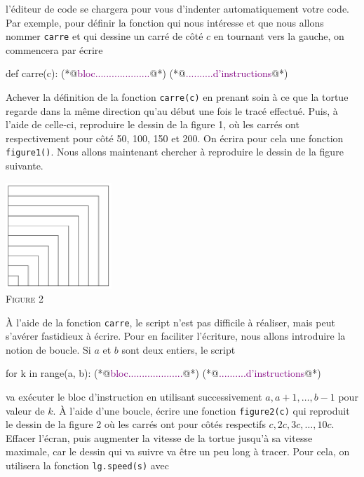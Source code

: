 \documentclass{magnolia}
\begin{document}
\begin{questions}
l'éditeur de code se chargera pour vous d'indenter automatiquement votre code. Par exemple, pour
définir la fonction qui nous intéresse et que nous allons nommer \verb!carre! et qui dessine un carré de côté
$c$ en tournant vers la gauche, on commencera par écrire
\begin{pythoncode}
def carre(c):
    (*@\textcolor{purple}{bloc....................}@*)
    (*@\textcolor{purple}{..........d'instructions}@*)
\end{pythoncode}
\question Achever la définition de la fonction \verb!carre(c)! en prenant soin à ce que la tortue regarde dans
  la même direction qu'au début une fois le tracé effectué. Puis, à l'aide de celle-ci, reproduire le dessin de la
  figure 1, où les carrés ont respectivement pour côté 50, 100, 150 et 200. On écrira pour cela une fonction \verb!figure1()!.
\enonce Nous allons maintenant chercher à reproduire le dessin de la figure suivante.
\begin{center}
  \includegraphics[width=0.3\textwidth]{../../Commun/Images/python-tp-logo-2}\\
  \textsc{Figure 2}
  \end{center}
  À l'aide de la fonction \verb!carre!, le script n'est pas difficile à réaliser, mais peut s'avérer
  fastidieux à écrire. Pour en faciliter l'écriture, nous allons introduire la notion de boucle. Si
  $a$ et $b$ sont deux entiers, le script
\begin{pythoncode}
for k in range(a, b):
    (*@\textcolor{purple}{bloc....................}@*)
    (*@\textcolor{purple}{..........d'instructions}@*)
\end{pythoncode}
va exécuter le bloc d'instruction en utilisant successivement $a, a+1, \ldots, b - 1$ pour valeur de $k$.
\question À l'aide d'une boucle, écrire une fonction
  \verb!figure2(c)! qui reproduit le dessin de la figure 2 où les carrés ont
  pour côtés respectifs $c, 2c, 3c, \ldots, 10c$.
\enonce Effacer l'écran, puis augmenter la vitesse de la tortue jusqu'à sa vitesse maximale, car le dessin
  qui va suivre va être un peu long à tracer. Pour cela, on utilisera la fonction \verb!lg.speed(s)! avec

\end{questions}
\end{document}
